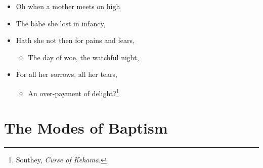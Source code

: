 \documentclass[
]{book}
\providecommand{\tightlist}{%
  \setlength{\itemsep}{0pt}\setlength{\parskip}{0pt}}
\begin{document}
\begin{itemize}
\item
  Oh when a mother meets on high\\
\item
  The babe she lost in infancy,
\item
  Hath she not then for pains and fears,

  \begin{itemize}
  \tightlist
  \item
    The day of woe, the watchful night,
  \end{itemize}
\item
  For all her sorrows, all her tears,

  \begin{itemize}
  \tightlist
  \item
    An over-payment of delight?\footnote{Southey, \emph{Curse of Kehama}.}
  \end{itemize}
\end{itemize}

\hypertarget{the-modes-of-baptism}{%
\section{The Modes of Baptism}\label{the-modes-of-baptism}}
\end{document}
